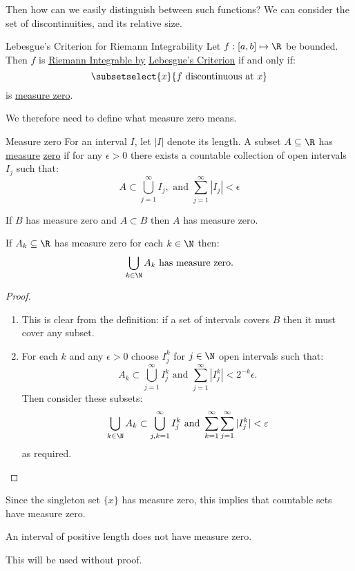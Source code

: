 \documentclass[../Main.tex]{subfiles}
\begin{document}
Then how can we easily distinguish between such functions? We can consider the set of discontinuities, and its relative size.
\begin{definition}{Lebesgue's Criterion for Riemann Integrability}
    Let $f : [a, b] \mapsto \R$ be bounded. Then $f$ is \underline{Riemann Integrable by} \underline{Lebesgue's Criterion} if and only if:
    \begin{equation*}
        \subsetselect{x}{f \text{ discontinuous at } x}
    \end{equation*}
    is \underline{measure zero}.
\end{definition}
We therefore need to define what measure zero means.
\begin{definition}{Measure zero}
    For an interval $I$, let $|I|$ denote its length. A subset $A \subseteq \R$ has \underline{measure} \underline{zero} if for any $\epsilon > 0$ there exists a countable collection of open intervals $I_j$ such that:
    \begin{equation*}
        A \subset \bigcup_{j = 1}^\infty I_j, \text{ and } \sum_{j = 1}^\infty |I_j| < \epsilon
    \end{equation*}
\end{definition}
\begin{propositions}{
        \label{propsMeasureZero}
    }
    \item If $B$ has measure zero and $A \subset B$ then $A$ has measure zero. \label{propMeasureZeroSubset}
    \item If $A_k\subseteq \R$ has measure zero for each $k \in \N$ then:
        \begin{equation*}
            \bigcup_{k \in \N} A_k \text{ has measure zero}.
        \end{equation*}
\end{propositions}
\begin{proof}
    \begin{enumerate}
        \item This is clear from the definition: if a set of intervals covers $B$ then it must cover any subset.
        \item For each $k$ and any $\epsilon > 0$ choose $I_j^k$ for $j \in \N$ open intervals such that:
            \begin{equation*}
                A_k \subset \bigcup_{j = 1}^\infty I_j^k \text{ and } \sum_{j = 1}^\infty |I_j^k| < 2^{-k}\epsilon.
            \end{equation*}
            Then consider these subsets:
            \begin{equation*}
                \bigcup_{k \in \N} A_k \subset \bigcup_{j, k = 1}^\infty I_j^k \text{ and } \sum_{k = 1}^\infty \sum_{j = 1}^\infty |I_j^k| < \epsilon
            \end{equation*}
            as required.
    \end{enumerate}
\end{proof}
Since the singleton set $\{x\}$ has measure zero, this implies that countable sets have measure zero.
\begin{lemma}
    An interval of positive length does not have measure zero.
\end{lemma}
This will be used without proof.
\end{document}

